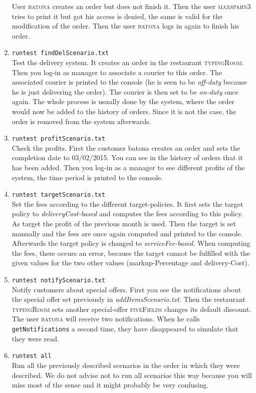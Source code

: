 \begin{enumerate}[itemsep=0mm]
		User \textsc{batona} creates an order but 
		does not finish it. Then the user \textsc{maxspahn3} tries to print it but got his
		access is denied, the same is valid for the modification of the order. Then the 
		user \textsc{batona} logs in again to finish his order.
	\item \lstinline|runtest findDelScenario.txt| \\
		Test the delivery system. It creates
		an order in the restaurant \textsc{typingRoom}. Then you log-in as manager to 
		associate a courier to this order. The associated courier is printed to the console 
		(he is seen to be \textit{off-duty} because he is just delivering the order). 
		The courier is then set to be \textit{on-duty} once again. The whole process is 
		usually done by the system, where the order would now be added to the history of 
		orders. Since it is not the case, the order is removed from the system afterwards.
	\item \lstinline|runtest profitScenario.txt| \\ 
		Check the profits. First the customer batona creates an order and sets the completion
		date to \textsc{03/02/2015}. You can see in the history of orders that it has been added.
		Then you log-in as a manager to see different profits of the system,
		the time period is printed to the console.
	\item \lstinline|runtest targetScenario.txt| \\
		Set the fees according to the different target-policies. It first sets the target policy to
		\textit{deliveryCost-based} and computes the fees according to this policy. As 
		target the profit of the previous month is used. Then the target is set manually and
		the fees are once again computed and printed to the console. Afterwards the 
		target policy is changed to \textit{serviceFee-based}. When computing the fees, there
		occurs an error, because the target cannot be fulfilled with the given values for 
		the two other values (markup-Percentage and delivery-Cost).
	\item \lstinline|runtest notifyScenario.txt| \\
		Notify customers about special offers. First you see the notifications about the 
		special offer set previously in \textit{addItemsScenario.txt}. Then the restaurant
		\textsc{typingRoom} sets another special-offer \textsc{fiveFields} changes its
		default discount. The user \textsc{batona} will receive two notifications. When he 
		calls \lstinline|getNotifications| a second time, they have disappeared to 
		simulate that they were read.
	\item \lstinline|runtest all| \\
		Run all the previously described scenarios in the order in which they were 
		described. We do not advise not to run all scenarios this way because you will
		miss most of the sense and it might probably be very confusing.
\end{enumerate}

